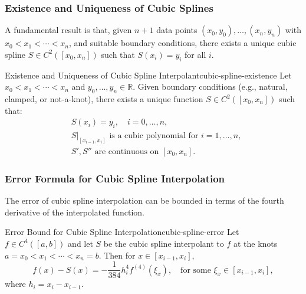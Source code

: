 \subsubsection{Existence and Uniqueness of Cubic Splines}
A fundamental result is that, given \(n+1\) data points \((x_0, y_0), \ldots, (x_n, y_n)\) with \(x_0 < x_1 < \cdots < x_n\), and suitable boundary conditions, there exists a unique cubic spline \(S \in C^2([x_0, x_n])\) such that \(S(x_i) = y_i\) for all \(i\).

\begin{theorem}{Existence and Uniqueness of Cubic Spline Interpolant}{cubic-spline-existence}
    Let \(x_0 < x_1 < \cdots < x_n\) and \(y_0, \ldots, y_n \in \mathbb{R}\). Given boundary conditions (e.g., natural, clamped, or not-a-knot), there exists a unique function \(S \in C^2([x_0, x_n])\) such that:
    \begin{align*}
         & S(x_i) = y_i, \quad i=0,\ldots,n,                                    \\
         & S|_{[x_{i-1}, x_i]} \text{ is a cubic polynomial for } i=1,\ldots,n, \\
         & S', S'' \text{ are continuous on } [x_0, x_n].
    \end{align*}
\end{theorem}

\subsubsection{Error Formula for Cubic Spline Interpolation}
The error of cubic spline interpolation can be bounded in terms of the fourth derivative of the interpolated function.

\begin{theorem}{Error Bound for Cubic Spline Interpolation}{cubic-spline-error}
    Let \(f \in C^4([a,b])\) and let \(S\) be the cubic spline interpolant to \(f\) at the knots \(a = x_0 < x_1 < \cdots < x_n = b\). Then for \(x \in [x_{i-1}, x_i]\),
    \[
        f(x) - S(x) = -\frac{1}{384} h_i^4 f^{(4)}(\xi_x), \quad \text{for some } \xi_x \in [x_{i-1}, x_i],
    \]
    where \(h_i = x_i - x_{i-1}\).
\end{theorem}

